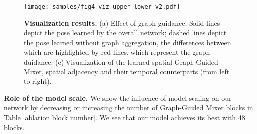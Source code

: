 \documentclass[10pt,twocolumn,letterpaper]{article}
\begin{document}
    
    \begin{table}[t]
    \centering
    \vspace{0.2em}
    \caption{\textbf{Ablation on block number}.
    The best result is achieved with 48 blocks with less than one million parameters.
    }
    \label{ablation block number}
    \end{table}



    
    \begin{figure}[ht]
    \centering
    \texttt{[image: samples/fig4\_viz\_upper\_lower\_v2.pdf]} \caption{\textbf{Visualization results.}
    (a) Effect of graph guidance. Solid lines depict the pose learned by the overall network; dashed lines depict the pose learned without graph aggregation, the differences between which are highlighted by red lines, which represent the graph duidance.
    (c) Visualization of the learned spatial Graph-Guided Mixer, spatial adjacency and their temporal counterparts (from left to right).
    }
    \label{viz_upper_lower}
\end{figure}



    
\noindent\textbf{Role of the model scale.}
We show the influence of model scaling on our network by decreasing or increasing the number of Graph-Guided Mixer blocks in Table \ref{ablation block number}.
We see that our model achieves its best with 48 blocks.


    

    
    
\end{document}
